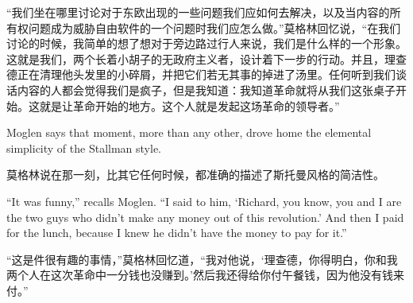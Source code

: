 \ifdefined\chs
“我们坐在哪里讨论对于东欧出现的一些问题我们应如何去解决，以及当内容的所有权问题成为威胁自由软件的一个问题时我们应怎么做。”莫格林回忆说，“在我们讨论的时候，我简单的想了想对于旁边路过行人来说，我们是什么样的一个形象。这就是我们，两个长着小胡子的无政府主义者，设计着下一步的行动。并且，理查德正在清理他头发里的小碎屑，并把它们若无其事的掉进了汤里。任何听到我们谈话内容的人都会觉得我们是疯子，但是我知道：我知道革命就将从我们这张桌子开始。这就是让革命开始的地方。这个人就是发起这场革命的领导者。”
\fi

\ifdefined\eng
Moglen says that moment, more than any other, drove home the elemental simplicity of the Stallman style.
\fi

\ifdefined\chs
莫格林说在那一刻，比其它任何时候，都准确的描述了斯托曼风格的简洁性。
\fi

\ifdefined\eng
``It was funny,'' recalls Moglen. ``I said to him, `Richard, you know, you and I are the two guys who didn't make any money out of this revolution.' And then I paid for the lunch, because I knew he didn't have the money to pay for it.''
\fi

\ifdefined\chs
“这是件很有趣的事情，”莫格林回忆道，“我对他说，‘理查德，你得明白，你和我两个人在这次革命中一分钱也没赚到。’然后我还得给你付午餐钱，因为他没有钱来付。” 
\fi

\theendnotes
\setcounter{endnote}{0}
